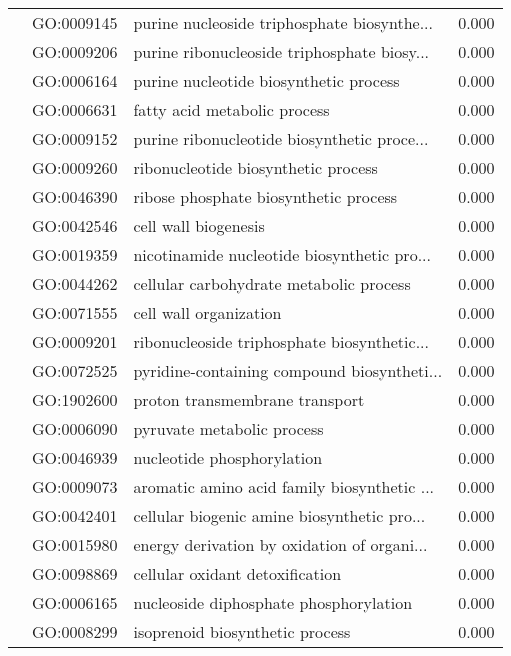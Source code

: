 \begin{longtable}{lllr}
   & GO:0009145 &  purine nucleoside triphosphate biosynthe... &         0.000 \\
   & GO:0009206 &  purine ribonucleoside triphosphate biosy... &         0.000 \\
   & GO:0006164 &       purine nucleotide biosynthetic process &         0.000 \\
   & GO:0006631 &                 fatty acid metabolic process &         0.000 \\
   & GO:0009152 &  purine ribonucleotide biosynthetic proce... &         0.000 \\
   & GO:0009260 &          ribonucleotide biosynthetic process &         0.000 \\
   & GO:0046390 &        ribose phosphate biosynthetic process &         0.000 \\
   & GO:0042546 &                         cell wall biogenesis &         0.000 \\
   & GO:0019359 &  nicotinamide nucleotide biosynthetic pro... &         0.000 \\
   & GO:0044262 &      cellular carbohydrate metabolic process &         0.000 \\
   & GO:0071555 &                       cell wall organization &         0.000 \\
   & GO:0009201 &  ribonucleoside triphosphate biosynthetic... &         0.000 \\
   & GO:0072525 &  pyridine-containing compound biosyntheti... &         0.000 \\
   & GO:1902600 &               proton transmembrane transport &         0.000 \\
   & GO:0006090 &                   pyruvate metabolic process &         0.000 \\
   & GO:0046939 &                   nucleotide phosphorylation &         0.000 \\
   & GO:0009073 &  aromatic amino acid family biosynthetic ... &         0.000 \\
   & GO:0042401 &  cellular biogenic amine biosynthetic pro... &         0.000 \\
   & GO:0015980 &  energy derivation by oxidation of organi... &         0.000 \\
   & GO:0098869 &              cellular oxidant detoxification &         0.000 \\
   & GO:0006165 &       nucleoside diphosphate phosphorylation &         0.000 \\
   & GO:0008299 &              isoprenoid biosynthetic process &         0.000 \\

\end{longtable}
